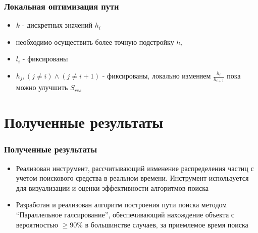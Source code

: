 \documentclass{beamer} %
\theoremstyle{definition} %
\begin{document}
\begin{frame}
\frametitle{Локальная оптимизация пути}
\begin{itemize}
\item{$k$ - дискретных значений $h_i$}
\item{необходимо осуществить более точную подстройку $h_i$}
\item{$l_i$ - фиксированы}
\item{$h_j, (j \neq i) \land (j \neq i+1)$ - фиксированы, локально изменяем $\frac{h_i}{h_{i+1}}$ пока можно улучшить $S_{res}$}
\end{itemize}
\end{frame}

\section{Полученные результаты}
\begin{frame}
\frametitle{Полученные результаты}
\begin{itemize}
\item{Реализован инструмент, рассчитывающий изменение распределения частиц с учетом поискового средства в реальном времени. Инструмент используется для визуализации и оценки эффективности алгоритмов поиска}
\item{Разработан и реализован алгоритм построения пути поиска методом ``Параллельное галсирование'', обеспечивающий нахождение объекта с вероятностью $\ge 90\%$ в большинстве случаев, за приемлемое время поиска}
\end{itemize}
\end{frame}
\end{document}
